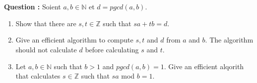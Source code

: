 \documentclass[11pt]{article} %
\newenvironment{question}[1][\unskip]{%
	\par
	\noindent
	\textbf{Question #1:}
	\noindent}
{\medskip}
\begin{document}
	\section{}
	\begin{question}
		Soient $a, b \in \mathbb{N}$ et $d=pgcd(a,b)$.
		\begin{enumerate}
			\item Show that there are $ s, t \in \mathbb {Z} $ such that $ sa + tb = d $.
			\item Give an efficient algorithm to compute $ s, t $ and $ d $ from $ a $ and $ b $. The algorithm should not calculate $ d $ before calculating $ s $ and $ t $.
			\item Let $ a, b \in \mathbb {N} $ such that $ b> 1 $ and $ pgcd (a, b) = 1 $. Give an efficient alqorith that calculates $ s \in \mathbb {Z} $ such that $ sa $ mod $ b = 1 $.
		\end{enumerate}
	\end{question}
\end{document}
